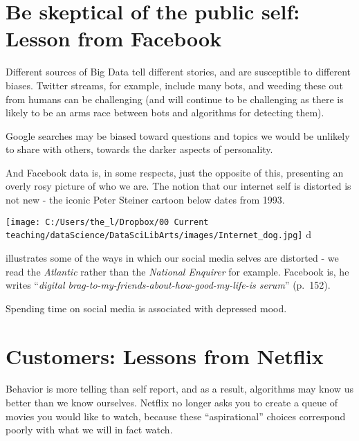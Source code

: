 \documentclass[]{book}
\theoremstyle{definition}
\theoremstyle{definition}
\theoremstyle{definition}
\theoremstyle{remark}
\begin{document}
\section{Be skeptical of the public self: Lesson from
Facebook}\label{be-skeptical-of-the-public-self-lesson-from-facebook}

Different sources of Big Data tell different stories, and are
susceptible to different biases. Twitter streams, for example, include
many bots, and weeding these out from humans can be challenging (and
will continue to be challenging as there is likely to be an arms race
between bots and algorithms for detecting them).

Google searches may be biased toward questions and topics we would be
unlikely to share with others, towards the darker aspects of
personality.

And Facebook data is, in some respects, just the opposite of this,
presenting an overly rosy picture of who we are. The notion that our
internet self is distorted is not new - the iconic Peter Steiner cartoon
below dates from 1993.

\texttt{[image: C:/Users/the\_l/Dropbox/00 Current teaching/dataScience/DataSciLibArts/images/Internet\_dog.jpg]}
d

\citet{stephens2017everybody} illustrates some of the ways in which our
social media selves are distorted - we read the \emph{Atlantic} rather
than the \emph{National Enquirer} for example. Facebook is, he writes
``\emph{digital brag-to-my-friends-about-how-good-my-life-is serum}''
(p.~152).

Spending time on social media is associated with depressed mood.

\section{Customers: Lessons from
Netflix}\label{customers-lessons-from-netflix}

Behavior is more telling than self report, and as a result, algorithms
may know us better than we know ourselves. Netflix no longer asks you to
create a queue of movies you would like to watch, because these
``aspirational'' choices correspond poorly with what we will in fact
watch.
\end{document}
